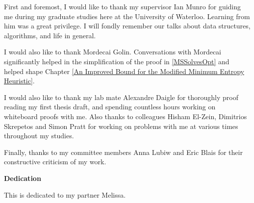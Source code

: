 First and foremost, I would like to thank my supervisor Ian Munro for guiding me during my graduate studies here at the University of Waterloo. Learning from him was a great privilege. I will fondly remember our talks about data structures, algorithms, and life in general.

I would also like to thank Mordecai Golin. Conversations with Mordecai significantly helped in the simplification of the proof in \ref{MSSolvesOpt} and helped shape Chapter \ref{An Improved Bound for the Modified Minimum Entropy Heuristic}. 

I would also like to thank my lab mate Alexandre Daigle for thoroughly proof reading my first thesis draft, and spending countless hours working on whiteboard proofs with me. Also thanks to colleagues Hisham El-Zein, Dimitrios Skrepetos and Simon Pratt for working on problems with me at various times throughout my studies.    

Finally, thanks to my committee members Anna Lubiw and Eric Blais for their constructive criticism of my work.


\cleardoublepage


\begin{center}\textbf{Dedication}\end{center}

This is dedicated to my partner Melissa.
\cleardoublepage

\renewcommand\contentsname{Table of Contents}
\tableofcontents
\cleardoublepage
{}

\listoftables
\cleardoublepage
{}		%

\listoffigures
\cleardoublepage
{}		%



